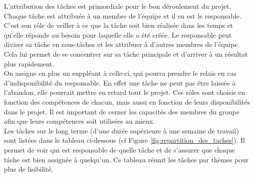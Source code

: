 

L'attribution des tâches est primordiale pour le bon déroulement du projet.
Chaque tâche est attribuée à un membre de l'équipe et il en est le responsable.
C'est son rôle de veiller à ce que la tâche soit bien réalisée dans les temps et qu'elle réponde au besoin pour laquelle elle a été créée.
Le responsable peut diviser sa tâche en sous-tâches et les attribuer à d'autres membres de l'équipe.
Cela lui permet de se concentrer sur sa tâche principale et d'arriver à un résultat plus rapidement.
\\

On assigne en plus un suppléant à celle-ci, qui pourra prendre le relais en cas d'indisponibilité du responsable.
En effet une tâche ne peut pas être laissée à l'abandon, elle pourrait mettre en retard tout le projet.
Ces rôles sont choisis en fonction des compétences de chacun, mais aussi en fonction de leurs disponibilités dans le projet.
Il est important de cerner les capacités des membres du groupe afin que leurs compétences soit utilisées au mieux.
\\

Les tâches sur le long terme (d'une durée supérieure à une semaine de travail)
sont listées dans le tableau ci-dessous (cf Figure \ref*{fig:repartition_des_taches}).
Il permet de voir qui est responsable de quelle tâche et de s'assurer que chaque tâche est bien assign\'ee à quelqu'un.
Ce tableau réunit les tâches par thèmes pour plus de lisibilité.


